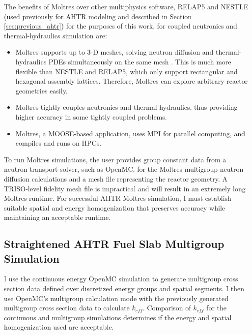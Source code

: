The benefits of Moltres over other multiphysics software, RELAP5 and NESTLE 
(used previously for \gls{AHTR} modeling and described in Section 
\ref{sec:previous_ahtr}) for the purposes of this work, for coupled neutronics 
and thermal-hydraulics simulation are: 
\begin{itemize}
  \item Moltres supports up to 3-D meshes, solving neutron diffusion and 
  thermal-hydraulics \glspl{PDE} simultaneously on the same mesh 
  \cite{park_advancement_2020}. This is much more flexible than 
  \gls{NESTLE} and RELAP5, which only support rectangular and hexagonal assembly 
  lattices. Therefore, Moltres can explore arbitrary reactor geometries easily.
  \item Moltres tightly couples neutronics and thermal-hydraulics, thus providing
    higher accuracy in some tightly coupled problems. 
  \item Moltres, a \gls{MOOSE}-based application, uses MPI for parallel computing,
  and compiles and runs on \glspl{HPC}. 
\end{itemize}

To run Moltres simulations, the user provides group constant data from a neutron 
transport solver, such as OpenMC, for the Moltres multigroup neutron diffusion 
calculations and a mesh file representing the reactor geometry. 
A TRISO-level fidelity mesh file is impractical and will result in an extremely 
long Moltres runtime. 
For successful \gls{AHTR} Moltres simulation, I must establish 
suitable spatial and energy homogenization that preserves accuracy while 
maintaining an acceptable runtime.

\subsection{Straightened AHTR Fuel Slab Multigroup Simulation}
I use the continuous energy OpenMC simulation to generate 
multigroup cross section data defined over discretized energy groups 
and spatial segments. 
I then use OpenMC's multigroup calculation mode with the previously generated 
multigroup cross section data to calculate $k_{eff}$. 
Comparison of $k_{eff}$ for the continuous and multigroup simulations
determines if the energy and spatial homogenization used are acceptable. 

